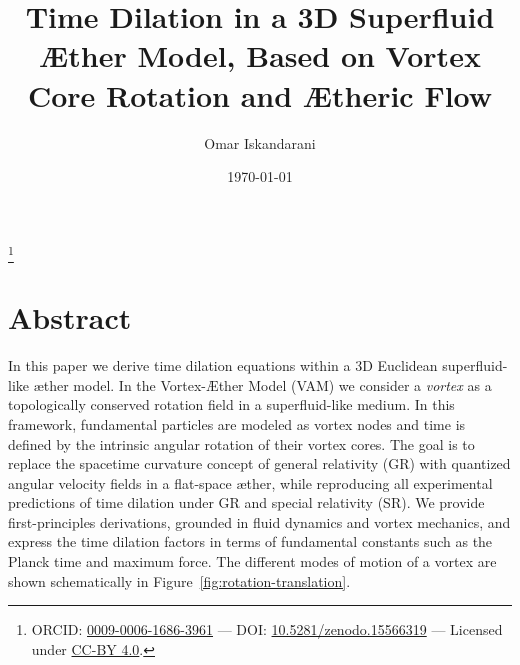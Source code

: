 \documentclass[a4paper,12pt]{revtex4}
\begin{document}
\author{Omar Iskandarani}
\title{Time Dilation in a 3D Superfluid Æther Model, Based on Vortex Core Rotation and Ætheric Flow}
\date{\today}
\thanks{ORCID: \href{https://orcid.org/0009-0006-1686-3961}{0009-0006-1686-3961} — \footnotesize DOI: \href{https://doi.org/10.5281/zenodo.15566319}{10.5281/zenodo.15566319}  — Licensed under \href{https://creativecommons.org/licenses/by/4.0/}{CC-BY 4.0}.}


\maketitle

\section*{Abstract}
In this paper we derive time dilation equations within a 3D Euclidean superfluid-like æther model. In the Vortex-Æther Model (VAM) we consider a \textit{vortex} as a topologically conserved rotation field in a superfluid-like medium. In this framework, fundamental particles are modeled as vortex nodes and time is defined by the intrinsic angular rotation of their vortex cores. The goal is to replace the spacetime curvature concept of general relativity (GR) with quantized angular velocity fields in a flat-space æther, while reproducing all experimental predictions of time dilation under GR and special relativity (SR). We provide first-principles derivations, grounded in fluid dynamics and vortex mechanics, and express the time dilation factors in terms of fundamental constants such as the Planck time and maximum force. The different modes of motion of a vortex are shown schematically in Figure~\ref{fig:rotation-translation}.
\end{document}
